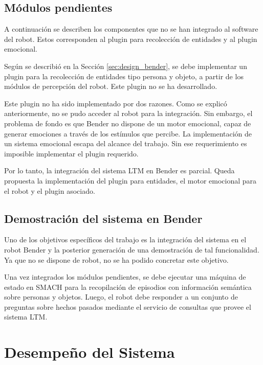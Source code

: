 \subsection{Módulos pendientes}

A continuación se describen los componentes que no se han integrado al software del robot. Estos corresponden al plugin para recolección de entidades y al plugin emocional.

 Según se describió en la Sección \ref{sec:design_bender}, se debe implementar un plugin para la recolección de entidades tipo persona y objeto, a partir de los módulos de percepción del robot. Este plugin no se ha desarrollado.

 Este plugin no ha sido implementado por dos razones. Como se explicó anteriormente, no se pudo acceder al robot para la integración. Sin embargo, el problema de fondo es que Bender no dispone de un motor emocional, capaz de generar emociones a través de los estímulos que percibe. La implementación de un sistema emocional escapa del alcance del trabajo. Sin ese requerimiento es imposible implementar el plugin requerido.


Por lo tanto, la integración del sistema LTM en Bender es parcial. Queda propuesta la implementación del plugin para entidades, el motor emocional para el robot y el plugin asociado.

\subsection{Demostración del sistema en Bender}

Uno de los objetivos específicos del trabajo es la integración del sistema en el robot Bender y la posterior generación de una demostración de tal funcionalidad. Ya que no se dispone de robot, no se ha podido concretar este objetivo. 

Una vez integrados los módulos pendientes, se debe ejecutar una máquina de estado en SMACH para la recopilación de episodios con información semántica sobre personas y objetos. Luego, el robot debe responder a un conjunto de preguntas sobre hechos pasados mediante el servicio de consultas que provee el sistema LTM.


\section{Desempeño del Sistema}

